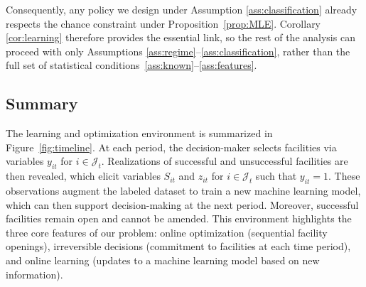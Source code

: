 \documentclass[nonblindrev]{informs3noheader}
\def\calJ{\mathcal{J}}
\begin{document}
Consequently, any policy we design under Assumption \ref{ass:classification} already respects the chance constraint under Proposition~\ref{prop:MLE}. Corollary \ref{cor:learning} therefore provides the essential link, so the rest of the analysis can proceed with only Assumptions \ref{ass:regime}--\ref{ass:classification}, rather than the full set of statistical conditions~\ref{ass:known}–\ref{ass:features}.

\subsection{Summary}

The learning and optimization environment is summarized in Figure~\ref{fig:timeline}. At each period, the decision-maker selects facilities via variables $y_{it}$ for $i\in\calJ_t$. Realizations of successful and unsuccessful facilities are then revealed, which elicit variables $S_{it}$ and $z_{it}$ for $i\in\calJ_t$ such that $y_{it}=1$. These observations augment the labeled dataset to train a new machine learning model, which can then support decision-making at the next period. Moreover, successful facilities remain open and cannot be amended. This environment highlights the three core features of our problem: online optimization (sequential facility openings), irreversible decisions (commitment to facilities at each time period), and online learning (updates to a machine learning model based on new information).
\end{document}
